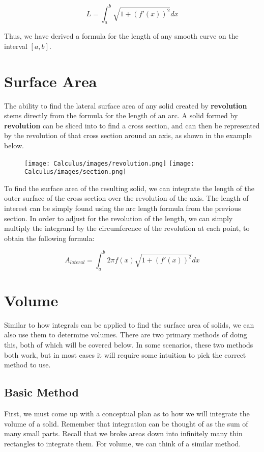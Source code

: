 \documentclass[11pt]{article}
\begin{document}
\[ L = \int_{a}^{b} \sqrt{1+ (f'(x))^2} dx\]

Thus, we have derived a formula for the length of any smooth curve on the interval $[a, b]$.

\section{Surface Area}
The ability to find the lateral surface area of any solid created by \textbf{revolution} stems directly from the formula for the length of an arc. A solid formed by \textbf{revolution} can be sliced into to find a cross section, and can then be represented by the revolution of that cross section around an axis, as shown in the example below.

\begin{figure}[h]
    \hspace*{2cm}
    \texttt{[image: Calculus/images/revolution.png]}
    \hspace*{2cm}
    \texttt{[image: Calculus/images/section.png]}
\end{figure}

To find the surface area of the resulting solid, we can integrate the length of the outer surface of the cross section over the revolution of the axis. The length of interest can be simply found using the arc length formula from the previous section. In order to adjust for the revolution of the length, we can simply multiply the integrand by the circumference of the revolution at each point, to obtain the following formula:

\[ A_{\textit{lateral}} = \int_{a}^{b} 2\pi f(x) \sqrt{1+(f'(x))^2} dx\]


\section{Volume}
Similar to how integrals can be applied to find the surface area of solids, we can also use them to determine volumes. There are two primary methods of doing this, both of which will be covered below. In some scenarios, these two methods both work, but in most cases it will require some intuition to pick the correct method to use.

\subsection{Basic Method}
First, we must come up with a conceptual plan as to how we will integrate the volume of a solid. Remember that integration can be thought of as the sum of many small parts. Recall that we broke areas down into infinitely many thin rectangles to integrate them. For volume, we can think of a similar method. 
\end{document}
